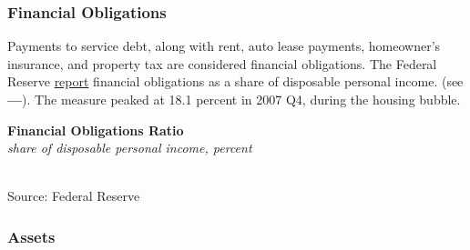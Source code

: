 \documentclass{report}
\makeatletter
\newcommand{\tbllink}[1]{\href{https://raw.githubusercontent.com/bdecon/US-chartbook/master/chartbook/data/#1}{\faTable}}
\newcommand*\short[1]{\expandafter\@gobbletwo\number\numexpr#1\relax}
\newcommand{\shdateaxisticks}{
		date coordinates in=x, axis line style={draw=none},
		xmax={2021-05-15},
		max space between ticks=40,	    
		xtick={{1990-01-01}, {1995-01-01}, {2000-01-01}, 
			{2005-01-01}, {2010-01-01}, {2015-01-01}, {2020-01-01}},
		minor xtick={},
		enlarge y limits={0.06}, enlarge x limits={0.01},
		}
\newcommand{\stdline}[4]{\addplot[very thick, no markers, color=#1] 
		table [x=#2, y=#3, col sep=comma] {#4};	}
\newcommand{\rbars}{
		\fill[color=black!10] (axis cs:{1990-07-01},\pgfkeysvalueof{/pgfplots/ymin}) rectangle 
			(axis cs:{1991-03-01}, \pgfkeysvalueof{/pgfplots/ymax});
		\fill[color=black!10] (axis cs:{2007-12-01},\pgfkeysvalueof{/pgfplots/ymin}) rectangle 
			(axis cs:{2009-07-01}, \pgfkeysvalueof{/pgfplots/ymax});
		\fill[color=black!10] (axis cs:{2001-03-01},\pgfkeysvalueof{/pgfplots/ymin}) rectangle 
			(axis cs:{2001-11-01}, \pgfkeysvalueof{/pgfplots/ymax});
		\fill[color=black!10] (axis cs:{2020-02-01},\pgfkeysvalueof{/pgfplots/ymin}) rectangle 
			(axis cs:{2021-05-15}, \pgfkeysvalueof{/pgfplots/ymax});}
\makeatother
\begin{document}
{\subsubsection*{\color{black!70} \seriffont Financial Obligations}
\begin{minipage}{0.3\textwidth}
\small Payments to service debt, along with rent, auto lease payments, homeowner's insurance, and property tax are considered financial obligations. The Federal Reserve \href{https://www.federalreserve.gov/releases/housedebt/default.htm}{report} financial obligations as a share of disposable personal income.   (see {\color{blue!80!black}\textbf{---}}). The measure peaked at 18.1 percent in 2007 Q4, during the housing bubble.
\end{minipage}\hspace{8mm}
\begin{minipage}{0.405\textwidth}
\normalsize \textbf{Financial Obligations Ratio}\\
\footnotesize{\textit{share of disposable personal income, percent}}\\
\hspace*{-2mm} \\
\footnotesize{Source: Federal Reserve} \hfill \tbllink{for.csv} 
\end{minipage}
\newpage
\begin{minipage}{0.76\textwidth}
\subsubsection*{\color{black!70} \seriffont Assets}

\small  

 


\vspace{2mm}


\end{minipage}}
\end{document}
